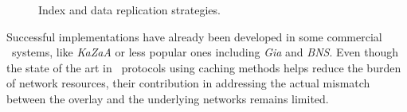 \begin{figure}[ht]
\centering
{}\qquad\qquad
{}
\caption{Index and data replication strategies.}
\label{figure:replication}
\end{figure}
Successful implementations have
already been developed in some commercial \p\ systems, like 
\emph{KaZaA} or less popular ones including \emph{Gia} and \emph{BNS}.
Even though the state of the art in \p\ protocols using caching methods
helps reduce the burden of network resources, 
their contribution in addressing the actual mismatch between the overlay
and the underlying networks remains limited.

